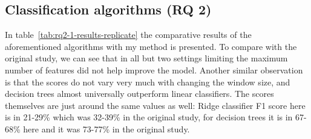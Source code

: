 \subsection{Classification algorithms (RQ 2)}
In table~\ref{tab:rq2-1-results-replicate} the comparative results of the aforementioned algorithms with my method is presented. 
To compare with the original study, we can see that in all but two settings limiting the maximum number of features did not help improve the model. Another similar observation is that the scores do not vary very much with changing the window size, and decision trees almost universally outperform linear classifiers.
The scores themselves are just around the same values as well: Ridge classifier F1 score here is in 21-29\% which was 32-39\% in the original study, for decision trees it is in 67-68\% here and it was 73-77\% in the original study. 


\begin{table}
\caption{Precision, recall, and F1 score of ridge classifiers (linear classifiers with L2 regularization) and decision tree classifiers with different sliding window widths ($w$). In this table, we only show the results of the best performing model in each group.}
\label{tab:rq2-1-results-replicate}
\end{table}
